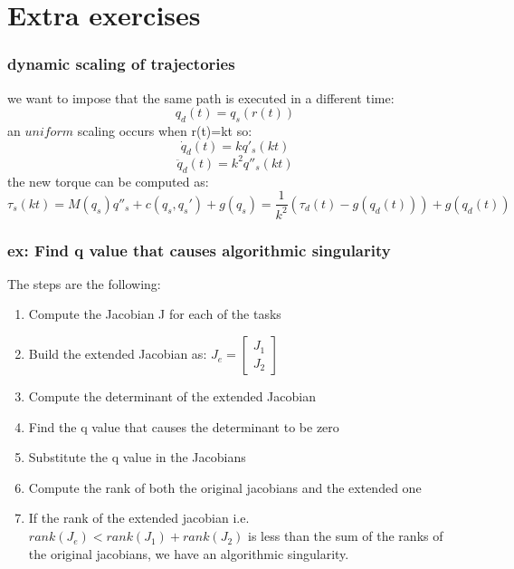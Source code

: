 \documentclass[a4paper,12pt]{article}
\begin{document}
\section{Extra exercises}
\subsubsection{dynamic scaling of trajectories}
we want to impose that the same path is executed in a different time:
\begin{equation}
  q_d(t) = q_s(r(t))
\end{equation}
an $uniform$ scaling occurs when r(t)=kt so:
\begin{equation}
    \dot{q}_d(t) = kq'_s(kt)
\end{equation}
\begin{equation}
    \ddot{q}_d(t) = k^2q''_s(kt)
\end{equation}
the new torque can be computed as:
\begin{equation}
    \tau_s(kt) = M(q_s)q''_s+c(q_s,q_s')+g(q_s) = \frac{1}{k^2}(\tau_d(t)-g(q_d(t)))+g(q_d(t))
\end{equation}
    \subsubsection{ex: Find q value that causes algorithmic singularity}
The steps are the following:
\begin{enumerate}
    \item Compute the Jacobian J for each of the tasks
    \item Build the extended Jacobian as: $J_e = \begin{bmatrix}
        J_1 \\
        J_2
    \end{bmatrix}$
    \item Compute the determinant of the extended Jacobian
    \item Find the q value that causes the determinant to be zero
    \item Substitute the q value in the Jacobians
    \item Compute the rank of both the original jacobians and the extended one
    \item If the rank of the extended jacobian i.e. $rank(J_e) <
     rank(J_1) + rank(J_2)$
    is less than the sum of the ranks of 
    the original jacobians, we have an algorithmic singularity.
\end{enumerate}
\end{document}
